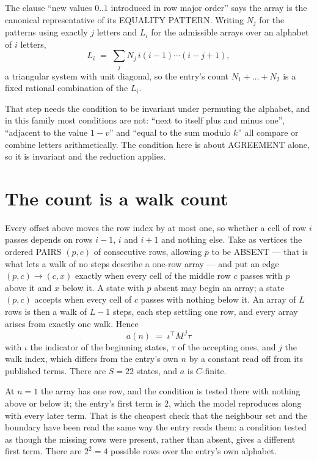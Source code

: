 \documentclass[11pt,a4paper]{article}
\theoremstyle{plain}
\theoremstyle{definition}
\begin{document}
The clause ``new values $0..1$ introduced in row major order'' says the array is the
canonical representative of its EQUALITY PATTERN. Writing $N_j$ for the patterns using exactly
$j$ letters and $L_i$ for the admissible arrays over an alphabet of $i$ letters,
\[
L_i\;=\;\sum_j N_j\,i(i-1)\cdots(i-j+1),
\]
a triangular system with unit diagonal, so the entry's count $N_1+\dots+N_{2}$ is a
fixed rational combination of the $L_i$.

That step needs the condition to be invariant under permuting the alphabet, and in this family
most conditions are not: ``next to itself plus and minus one'', ``adjacent to the value
$1-v$'' and ``equal to the sum modulo $k$'' all compare or combine letters arithmetically.
The condition here is about AGREEMENT alone, so it is invariant and the reduction applies.

\section{The count is a walk count}

Every offset above moves the row index by at most one, so whether a cell of row $i$ passes
depends on rows $i-1$, $i$ and $i+1$ and nothing else. Take as vertices the ordered PAIRS
$(p,c)$ of consecutive rows, allowing $p$ to be ABSENT --- that is what lets a walk of no steps
describe a one-row array --- and put an edge $(p,c)\to(c,x)$ exactly when every cell of the
middle row $c$ passes with $p$ above it and $x$ below it. A state with $p$ absent may begin an
array; a state $(p,c)$ accepts when every cell of $c$ passes with nothing below it. An array of
$L$ rows is then a walk of $L-1$ steps, each step settling one row, and every array arises from
exactly one walk. Hence
\[
a(n)\;=\;\iota^{\!\top}M^{\,j}\tau
\]
with $\iota$ the indicator of the beginning states, $\tau$ of the accepting ones, and $j$ the
walk index, which differs from the entry's own $n$ by a constant read off from its published
terms. There are $S=22$ states, and $a$ is $C$-finite.

At $n=1$ the array has one row, and
the condition is tested there with nothing above or below it; the entry's first term is
$2$, which the model reproduces along with every later term. That is the cheapest check
that the neighbour set and the boundary have been read the same way the entry reads them: a
condition tested as though the missing rows were present, rather than absent, gives a different
first term. There are $2^{2}=4$ possible rows over the entry's own alphabet.
\end{document}
